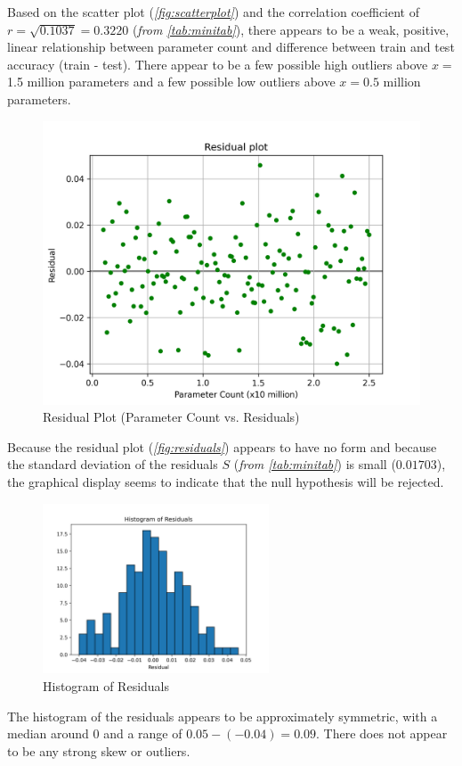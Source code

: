 \documentclass[12pt]{article}
\begin{document}
    \noindent
    Based on the scatter plot (\textit{\autoref{fig:scatterplot}}) and the correlation coefficient of $r=\sqrt{0.1037}=0.3220$ (\textit{from \autoref{tab:minitab}}), there appears to be a weak,
    positive, linear relationship between parameter count and difference between train and test accuracy (train - test).
    There appear to be a few possible high outliers above $x =$ 1.5 million parameters
    and a few possible low outliers above $x = 0.5$ million parameters.
    \begin{figure}[H]
        \centering
        \includegraphics[width=1\textwidth]{Images/Resid}
        \caption{Residual Plot (Parameter Count vs. Residuals)}
        \label{fig:residuals}
    \end{figure}
    \noindent Because the residual plot (\textit{\autoref{fig:residuals}}) appears to have no form and because the standard
    deviation of the residuals $S$ (\textit{from \autoref{tab:minitab}}) is small ($0.01703$), the graphical display seems to
    indicate that the null hypothesis will be rejected.
    \begin{figure}[H]
        \centering
        \includegraphics[width=0.6\textwidth]{Images/Resid Hist}
        \caption{Histogram of Residuals}
        \label{fig:residual_hist}
    \end{figure}
    \noindent The histogram of the residuals appears to be approximately symmetric, with a median around 0 and a range of
    $0.05-(-0.04)=0.09$. There does not appear to be any strong skew or outliers.
\end{document}
